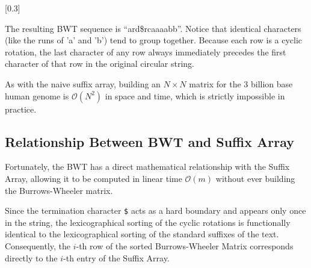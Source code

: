


[0.3]

The resulting BWT sequence is ``ard\$rcaaaabb''. Notice that identical characters (like the runs of 'a' and 'b') tend to group together. Because each row is a cyclic rotation, the last character of any row always immediately precedes the first character of that row in the original circular string. 

\sta As with the naive suffix array, building an \( N \times N \) matrix for the 3 billion base human genome is \( \mathcal{O}(N^2) \) in space and time, which is strictly impossible in practice. 

\subsection{Relationship Between BWT and Suffix Array}
Fortunately, the BWT has a direct mathematical relationship with the Suffix Array, allowing it to be computed in linear time \( \mathcal{O}(m) \) without ever building the Burrows-Wheeler matrix.

Since the termination character \verb|$| acts as a hard boundary and appears only once in the string, the lexicographical sorting of the cyclic rotations is functionally identical to the lexicographical sorting of the standard suffixes of the text. Consequently, the \( i \)-th row of the sorted Burrows-Wheeler Matrix corresponds directly to the \( i \)-th entry of the Suffix Array. 

